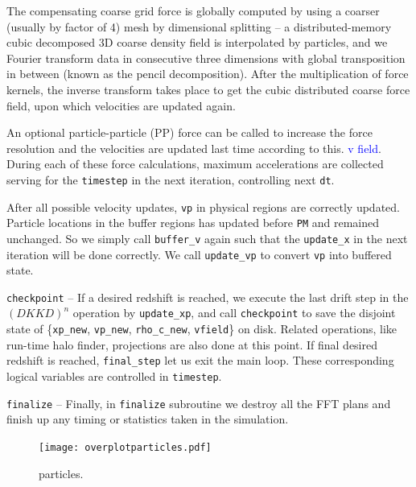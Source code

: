 \documentclass[10pt,twocolumn,preprint]{emulateapj}
\newcommand{\tcb}{\textcolor{blue}}
\begin{document}
The compensating coarse grid force is globally computed by using a coarser (usually by factor of 4) mesh by dimensional splitting -- a distributed-memory cubic decomposed 3D coarse density field is interpolated by particles, and we Fourier transform data in consecutive three dimensions with global transposition in between (known as the pencil decomposition). After the multiplication of force kernels, the inverse transform takes place to get the cubic distributed coarse force field, upon which velocities are updated again.

An optional particle-particle (PP) force can be called to increase the force resolution and the velocities are updated last time according to this. \tcb{v field}. During each of these force calculations, maximum accelerations are collected serving for the {\tt timestep} in the next iteration, controlling next {\tt dt}.

After all possible velocity updates, {\tt vp} in physical regions are correctly updated. Particle locations in the buffer regions has updated before {\tt PM} and remained unchanged. So we simply call {\tt buffer\_v} again such that the {\tt update\_x} in the next iteration will be done correctly. We call {\tt update\_vp} to convert {\tt vp} into buffered state.

{\tt checkpoint} -- 
If a desired redshift is reached, we execute the last drift step in the $(DKKD)^n$ operation by {\tt update\_xp}, and call {\tt checkpoint} to save the disjoint state of \{{\tt xp\_new}, {\tt vp\_new}, {\tt rho\_c\_new}, {\tt vfield}\} on disk. Related operations, like run-time halo finder, projections are also done at this point. If final desired redshift is reached, {\tt final\_step} let us exit the main loop. These corresponding logical variables are controlled in {\tt timestep}.

{\tt finalize} --
Finally, in {\tt finalize} subroutine we destroy all the FFT plans and finish up any timing or statistics taken in the simulation.

\begin{figure}[t]
\centering
  \texttt{[image: overplotparticles.pdf]}
 \caption{particles.}
\label{fig.particles}
\end{figure}
\end{document}
